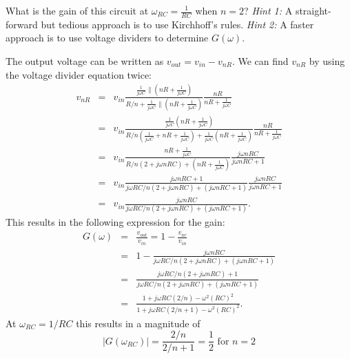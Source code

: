 \documentclass[letterpaper,addpoints,answers]{exam}
\begin{document}
\begin{questions}
\begin{question}
\begin{parts}
  \bonuspart[10]
   What is the gain of this circuit at $\omega_{RC} = \frac{1}{RC}$ when $n = 2$? \emph{Hint 1:} A straight-forward but tedious approach is to use Kirchhoff's rules. \emph{Hint 2:} A faster approach is to use voltage dividers to determine $G(\omega)$.
  \begin{solution}[4.0in]
   The output voltage can be written as $v_{out} = v_{in} - v_{nR}$.  We can find $v_{nR}$ by using the voltage divider equation twice:
   \begin{eqnarray*}
   v_{nR} & = & v_{in} \frac{\frac{1}{j\omega C} \parallel (nR + \frac{1}{j\omega C})}{R/n + \frac{1}{j\omega C} \parallel (nR + \frac{1}{j\omega C})} \frac{nR}{nR + \frac{1}{j\omega C}} \\
   & = & v_{in} \frac{\frac{1}{j\omega C} (nR + \frac{1}{j\omega C})}{R/n (\frac{1}{j\omega C} + nR + \frac{1}{j\omega C}) + \frac{1}{j\omega C} (nR + \frac{1}{j\omega C})} \frac{nR}{nR + \frac{1}{j\omega C}} \\
   & = & v_{in} \frac{nR + \frac{1}{j\omega C}}{R/n (2 + j\omega n R C) + (nR + \frac{1}{j\omega C})} \frac{j \omega n R C}{j \omega n R C + 1} \\
   & = & v_{in} \frac{j \omega n R C + 1}{j \omega R C /n (2 + j \omega n R C) + (j \omega n R C + 1)} \frac{j \omega n R C}{j \omega n R C + 1} \\
   & = & v_{in} \frac{j \omega n R C}{j \omega R C /n (2 + j \omega n R C) + (j \omega n R C + 1)}.
   \end{eqnarray*}
   This results in the following expression for the gain:
   \begin{eqnarray*}
    G(\omega) & = & \frac{v_{out}}{v_{in}} = 1 - \frac{v_{nr}}{v_{in}} \\
    & = & 1 - \frac{j \omega n R C}{j \omega R C /n (2 + j \omega n R C) + (j \omega n R C + 1)} \\
    & = & \frac{j \omega R C /n (2 + j \omega n R C) + 1}{j \omega R C /n (2 + j \omega n R C) + (j \omega n R C + 1)} \\
    & = & \frac{1 + j \omega R C (2 / n) - \omega^2 (R C)^2}{1 + j \omega R C (2 / n + 1) - \omega^2 (R C)^2}.
   \end{eqnarray*}
   At $\omega_{RC} = 1/RC$ this results in a magnitude of
   \begin{equation*}
    |G(\omega_{RC})| = \frac{2 / n}{2 / n + 1} = \frac{1}{2} \mbox{ for } n=2
   \end{equation*}
  \end{solution}
 
 \end{parts}
\end{question}

\end{questions}
\end{document}
